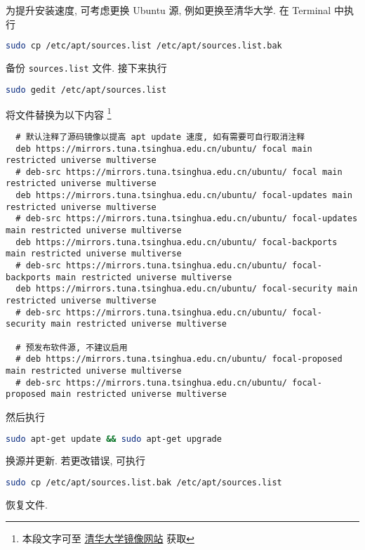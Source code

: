 为提升安装速度, 可考虑更换 Ubuntu 源, 例如更换至清华大学.
在 \textsf{Terminal} 中执行
\begin{lstlisting}[language = bash]
  sudo cp /etc/apt/sources.list /etc/apt/sources.list.bak
\end{lstlisting}
备份 \texttt{sources.list} 文件.
接下来执行
\begin{lstlisting}[language = bash]
  sudo gedit /etc/apt/sources.list
\end{lstlisting}
将文件替换为以下内容%
\footnote{本段文字可至%
  \href{https://mirrors.tuna.tsinghua.edu.cn/help/ubuntu/}{清华大学镜像网站}%
  获取}
\begin{lstlisting}
  # 默认注释了源码镜像以提高 apt update 速度, 如有需要可自行取消注释
  deb https://mirrors.tuna.tsinghua.edu.cn/ubuntu/ focal main restricted universe multiverse
  # deb-src https://mirrors.tuna.tsinghua.edu.cn/ubuntu/ focal main restricted universe multiverse
  deb https://mirrors.tuna.tsinghua.edu.cn/ubuntu/ focal-updates main restricted universe multiverse
  # deb-src https://mirrors.tuna.tsinghua.edu.cn/ubuntu/ focal-updates main restricted universe multiverse
  deb https://mirrors.tuna.tsinghua.edu.cn/ubuntu/ focal-backports main restricted universe multiverse
  # deb-src https://mirrors.tuna.tsinghua.edu.cn/ubuntu/ focal-backports main restricted universe multiverse
  deb https://mirrors.tuna.tsinghua.edu.cn/ubuntu/ focal-security main restricted universe multiverse
  # deb-src https://mirrors.tuna.tsinghua.edu.cn/ubuntu/ focal-security main restricted universe multiverse
  
  # 预发布软件源, 不建议启用
  # deb https://mirrors.tuna.tsinghua.edu.cn/ubuntu/ focal-proposed main restricted universe multiverse
  # deb-src https://mirrors.tuna.tsinghua.edu.cn/ubuntu/ focal-proposed main restricted universe multiverse
\end{lstlisting}
然后执行
\begin{lstlisting}[language = bash]
  sudo apt-get update && sudo apt-get upgrade
\end{lstlisting}
换源并更新.
若更改错误,
可执行
\begin{lstlisting}[language=bash]
  sudo cp /etc/apt/sources.list.bak /etc/apt/sources.list
\end{lstlisting}
恢复文件.
